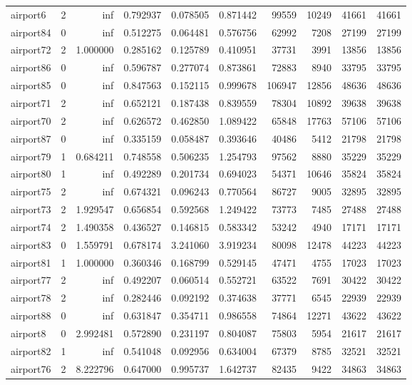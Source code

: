 \begin{longtable}{|l|r|r|r|r|r|r|r|r|r|}
airport6 & 2 & inf & 0.792937 & 0.078505 & 0.871442 & 99559 & 10249 & 41661 & 41661 \\
airport84 & 0 & inf & 0.512275 & 0.064481 & 0.576756 & 62992 & 7208 & 27199 & 27199 \\
airport72 & 2 & 1.000000 & 0.285162 & 0.125789 & 0.410951 & 37731 & 3991 & 13856 & 13856 \\
airport86 & 0 & inf & 0.596787 & 0.277074 & 0.873861 & 72883 & 8940 & 33795 & 33795 \\
airport85 & 0 & inf & 0.847563 & 0.152115 & 0.999678 & 106947 & 12856 & 48636 & 48636 \\
airport71 & 2 & inf & 0.652121 & 0.187438 & 0.839559 & 78304 & 10892 & 39638 & 39638 \\
airport70 & 2 & inf & 0.626572 & 0.462850 & 1.089422 & 65848 & 17763 & 57106 & 57106 \\
airport87 & 0 & inf & 0.335159 & 0.058487 & 0.393646 & 40486 & 5412 & 21798 & 21798 \\
airport79 & 1 & 0.684211 & 0.748558 & 0.506235 & 1.254793 & 97562 & 8880 & 35229 & 35229 \\
airport80 & 1 & inf & 0.492289 & 0.201734 & 0.694023 & 54371 & 10646 & 35824 & 35824 \\
airport75 & 2 & inf & 0.674321 & 0.096243 & 0.770564 & 86727 & 9005 & 32895 & 32895 \\
airport73 & 2 & 1.929547 & 0.656854 & 0.592568 & 1.249422 & 73773 & 7485 & 27488 & 27488 \\
airport74 & 2 & 1.490358 & 0.436527 & 0.146815 & 0.583342 & 53242 & 4940 & 17171 & 17171 \\
airport83 & 0 & 1.559791 & 0.678174 & 3.241060 & 3.919234 & 80098 & 12478 & 44223 & 44223 \\
airport81 & 1 & 1.000000 & 0.360346 & 0.168799 & 0.529145 & 47471 & 4755 & 17023 & 17023 \\
airport77 & 2 & inf & 0.492207 & 0.060514 & 0.552721 & 63522 & 7691 & 30422 & 30422 \\
airport78 & 2 & inf & 0.282446 & 0.092192 & 0.374638 & 37771 & 6545 & 22939 & 22939 \\
airport88 & 0 & inf & 0.631847 & 0.354711 & 0.986558 & 74864 & 12271 & 43622 & 43622 \\
airport8 & 0 & 2.992481 & 0.572890 & 0.231197 & 0.804087 & 75803 & 5954 & 21617 & 21617 \\
airport82 & 1 & inf & 0.541048 & 0.092956 & 0.634004 & 67379 & 8785 & 32521 & 32521 \\
airport76 & 2 & 8.222796 & 0.647000 & 0.995737 & 1.642737 & 82435 & 9422 & 34863 & 34863 \\

\end{longtable}
